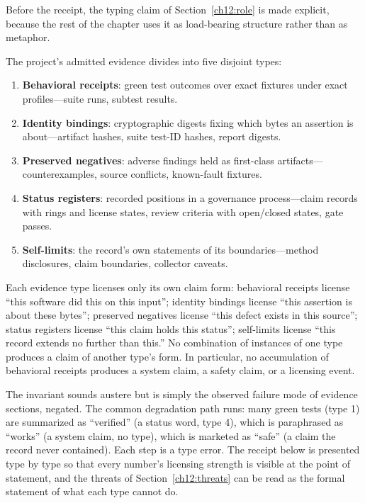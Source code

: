 Before the receipt, the typing claim of Section~\ref{ch12:role} is made explicit, because the rest of the chapter uses it as load-bearing structure rather than as metaphor.

\begin{definition}\label{ch12:def-evtypes}
The project's admitted evidence divides into five disjoint types:
\begin{enumerate}
\item \textbf{Behavioral receipts}: green test outcomes over exact fixtures under exact profiles---suite runs, subtest results.
\item \textbf{Identity bindings}: cryptographic digests fixing which bytes an assertion is about---artifact hashes, suite test-ID hashes, report digests.
\item \textbf{Preserved negatives}: adverse findings held as first-class artifacts---counterexamples, source conflicts, known-fault fixtures.
\item \textbf{Status registers}: recorded positions in a governance process---claim records with rings and license states, review criteria with open/closed states, gate passes.
\item \textbf{Self-limits}: the record's own statements of its boundaries---method disclosures, claim boundaries, collector caveats.
\end{enumerate}
\end{definition}

\begin{invariant}\label{ch12:inv-strength}
Each evidence type licenses only its own claim form: behavioral receipts license ``this software did this on this input''; identity bindings license ``this assertion is about these bytes''; preserved negatives license ``this defect exists in this source''; status registers license ``this claim holds this status''; self-limits license ``this record extends no further than this.'' No combination of instances of one type produces a claim of another type's form. In particular, no accumulation of behavioral receipts produces a system claim, a safety claim, or a licensing event.
\end{invariant}

The invariant sounds austere but is simply the observed failure mode of evidence sections, negated. The common degradation path runs: many green tests (type 1) are summarized as ``verified'' (a status word, type 4), which is paraphrased as ``works'' (a system claim, no type), which is marketed as ``safe'' (a claim the record never contained). Each step is a type error. The receipt below is presented type by type so that every number's licensing strength is visible at the point of statement, and the threats of Section~\ref{ch12:threats} can be read as the formal statement of what each type cannot do.

